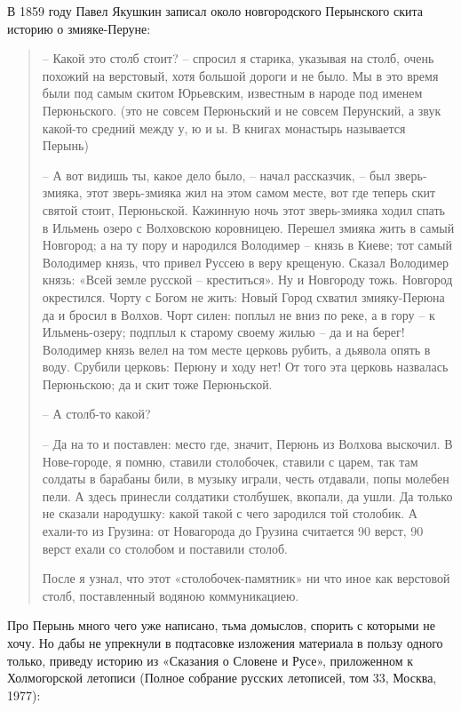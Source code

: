 В 1859 году Павел Якушкин записал\cite[стр. 118]{yakushin01} около новгородского Перынского скита историю о змияке-Перуне:

\begin{quotation}
   – Какой это столб стоит?  – спросил я старика, указывая на столб, очень похожий на верстовый, хотя большой дороги и не было. Мы в это время были под самым скитом Юрьевским, известным в народе под именем Перюньского. (это не совсем Перюньский и не совсем Перунский, а звук какой-то средний между у, ю и ы. В книгах монастырь называется Перынь)

   – А вот видишь ты, какое дело было,  – начал рассказчик,  – был зверь-змияка, этот зверь-змияка жил на этом самом месте, вот где теперь скит святой стоит, Перюньской. Кажинную ночь этот зверь-змияка ходил спать в Ильмень озеро с Волховскою коровницею. Перешел змияка жить в самый Новгород; а на ту пору и народился Володимер –  князь в Киеве; тот самый Володимер князь, что привел Руссею в веру крещеную. Сказал Володимер князь: «Всей земле русской – креститься». Ну и Новгороду тожь. Новгород окрестился. Чорту с Богом не жить: Новый Город схватил змияку-Перюна да и бросил в Волхов. Чорт силен: поплыл не вниз по реке, а в гору – к Ильмень-озеру; подплыл к старому своему жилью – да и на берег! Володимер князь велел на том месте церковь рубить, а дьявола опять в воду. Срубили церковь: Перюну и ходу нет! От того эта церковь назвалась Перюньскою; да и скит тоже Перюньской.

  – А столб-то какой?

   – Да на то и поставлен: место где, значит, Перюнь из Волхова выскочил. В Нове-городе, я помню, ставили столобочек, ставили с царем, так там солдаты в барабаны били, в музыку играли, честь отдавали, попы молебен пели. А здесь принесли солдатики столбушек, вкопали, да ушли. Да только не сказали народушку: какой такой с чего зародился той столобик. А ехали-то из Грузина: от Новагорода до Грузина считается 90 верст, 90 верст ехали со столобом и поставили столоб.

После я узнал, что этот «столобочек-памят\-ник» ни что иное как верстовой столб, поставленный водяною коммуникациею.
\end{quotation}

Про Перынь много чего уже написано, тьма домыслов, спорить с которыми не хочу. Но дабы не упрекнули в подтасовке изложения материала в пользу одного только, приведу историю из «Сказания о Словене и Русе», приложенном к Холмогорской летописи (Полное собрание русских летописей, том 33, Москва, 1977):

